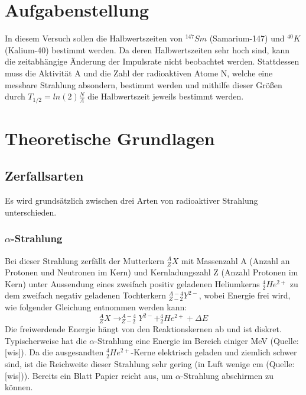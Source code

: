\section{Aufgabenstellung}
In diesem Versuch sollen die Halbwertszeiten von $^{147}Sm$ (Samarium-147) und $^{40}K$ (Kalium-40) bestimmt werden. Da deren Halbwertszeiten sehr hoch sind, kann die zeitabhängige Änderung der Impulsrate nicht beobachtet werden. Stattdessen muss die Aktivität A und die Zahl der radioaktiven Atome N, welche eine messbare Strahlung absondern, bestimmt werden und mithilfe dieser Größen durch $T_{1/2}=ln(2)\frac{N}{A}$ die Halbwertszeit jeweils bestimmt werden.
\section{Theoretische Grundlagen}
\subsection{Zerfallsarten}
Es wird grundsätzlich zwischen drei Arten von radioaktiver Strahlung unterschieden.
\subsubsection{$\alpha$-Strahlung}
Bei dieser Strahlung zerfällt der Mutterkern $^{A}_{Z}X$ mit Massenzahl A (Anzahl an Protonen und Neutronen im Kern) und Kernladungszahl Z (Anzahl Protonen im Kern) unter Aussendung eines zweifach positiv geladenen Heliumkerns $^{4}_{2}He^{2+}$ zu dem zweifach negativ geladenen Tochterkern $^{A-4}_{Z-2}Y^{2-}$, wobei Energie frei wird, wie folgender Gleichung entnommen werden kann: \[^{A}_{Z}X\rightarrow ^{A-4}_{Z-2}Y^{2-}+^{4}_{2}He^{2+}+\Delta E\]
Die freiwerdende Energie hängt von den Reaktionskernen ab und ist diskret. Typischerweise hat die $\alpha$-Strahlung eine Energie im Bereich einiger MeV (Quelle: [wis]). Da die ausgesandten $^{4}_{2}He^{2+}$-Kerne elektrisch geladen und ziemlich schwer sind, ist die Reichweite dieser Strahlung sehr gering (in Luft wenige cm (Quelle: [wis])). Bereits ein Blatt Papier reicht aus, um $\alpha$-Strahlung abschirmen zu können.
